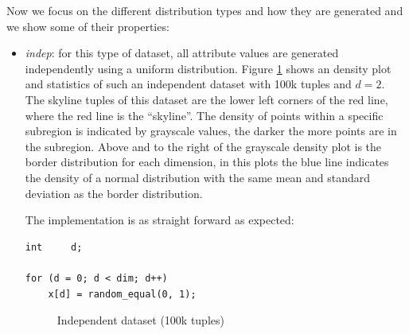 Now we focus on the different distribution types and how they are
generated and we show some of their properties:

\begin{itemize}
\item \emph{indep}: 
for this type of dataset, all attribute values are generated
independently using a uniform distribution. Figure
\ref{fig:density-2d-i2d1e5} shows an density plot and statistics of
such an independent dataset with 100k tuples and $d = 2$. The skyline
tuples of this dataset are the lower left corners of the red line,
where the red line is the ``skyline''. The density of points within a
specific subregion is indicated by grayscale values, the darker the
more points are in the subregion. Above and to the right of the
grayscale density plot is the border distribution for each dimension,
in this plots the blue line indicates the density of a normal
distribution with the same mean and standard deviation as the border
distribution.

The implementation is as straight forward as expected:

\begin{lstlisting}
int		d;

for (d = 0; d < dim; d++)
	x[d] = random_equal(0, 1);
\end{lstlisting}

\begin{figure}[htbp]
\centering
{}
\label{fig:density-2d-i2d1e5}
\caption{Independent dataset (100k tuples)}
\end{figure}


\end{itemize}
